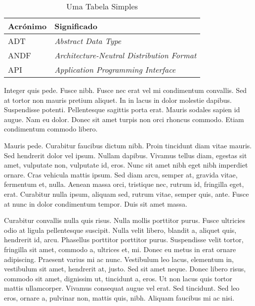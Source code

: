 \begin{table}[t]
  \centering
  \caption{Uma Tabela Simples}
\begin{tabular}{| l | p{45mm} |}
	\hline
\textbf{Acrónimo} & \textbf{Significado}\\
	\hline
	\hline
        ADT   & \emph{Abstract Data Type}\\\hline
        ANDF  & \emph{Architecture-Neutral Distribution Format}\\\hline
        API   & \emph{Application Programming Interface}\\
	\hline
\end{tabular}
  \label{tab:exemplo1}
\end{table}

Integer quis pede. Fusce nibh. Fusce nec erat vel mi condimentum
convallis. Sed at tortor non mauris pretium aliquet. In in lacus in
dolor molestie dapibus. Suspendisse potenti. Pellentesque sagittis
porta erat. Mauris sodales sapien id augue. Nam eu dolor. Donec sit
amet turpis non orci rhoncus commodo. Etiam condimentum commodo
libero.

Mauris pede. Curabitur faucibus dictum nibh. Proin tincidunt diam
vitae mauris. Sed hendrerit dolor vel ipsum. Nullam dapibus. Vivamus
tellus diam, egestas sit amet, vulputate non, vulputate id, eros. Nunc
sit amet nibh eget nibh imperdiet ornare. Cras vehicula mattis
ipsum. Sed diam arcu, semper at, gravida vitae, fermentum et,
nulla. Aenean massa orci, tristique nec, rutrum id, fringilla eget,
erat. Curabitur nulla ipsum, aliquam sed, rutrum vitae, semper quis,
ante. Fusce at nunc in dolor condimentum tempor. Duis sit amet massa. 

Curabitur convallis nulla quis risus. Nulla mollis porttitor
purus. Fusce ultricies odio at ligula pellentesque suscipit. Nulla
velit libero, blandit a, aliquet quis, hendrerit id, arcu. Phasellus
porttitor porttitor purus. Suspendisse velit tortor, fringilla sit
amet, commodo a, ultrices et, mi. Donec eu metus in erat ornare
adipiscing. Praesent varius mi ac nunc. Vestibulum leo lacus,
elementum in, vestibulum sit amet, hendrerit at, justo. Sed sit amet
neque. Donec libero risus, commodo sit amet, dignissim ut, tincidunt
a, eros. Ut non lacus quis tortor mattis ullamcorper. Vivamus
consequat augue vel erat. Sed tincidunt. Sed leo eros, ornare a,
pulvinar non, mattis quis, nibh. Aliquam faucibus mi ac nisi.

